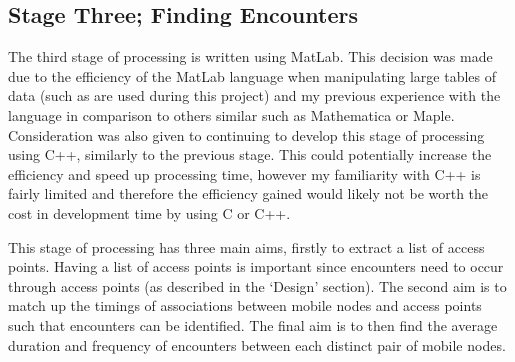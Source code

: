 \subsection{Stage Three; Finding Encounters} 

The third stage of processing is written using MatLab. This decision was made due to the efficiency of the MatLab language when manipulating large tables of data (such as are used during this project) and my previous experience with the language in comparison to others similar such as Mathematica or Maple. Consideration was also given to continuing to develop this stage of processing using C++, similarly to the previous stage. This could potentially increase the efficiency and speed up processing time, however my familiarity with C++ is fairly limited and therefore the efficiency gained would likely not be worth the cost in development time by using C or C++.

This stage of processing has three main aims, firstly to extract a list of access points. Having a list of access points is important since encounters need to occur through access points (as described in the `Design' section). The second aim is to match up the timings of associations between mobile nodes and access points such that encounters can be identified. The final aim is to then find the average duration and frequency of encounters between each distinct pair of mobile nodes.